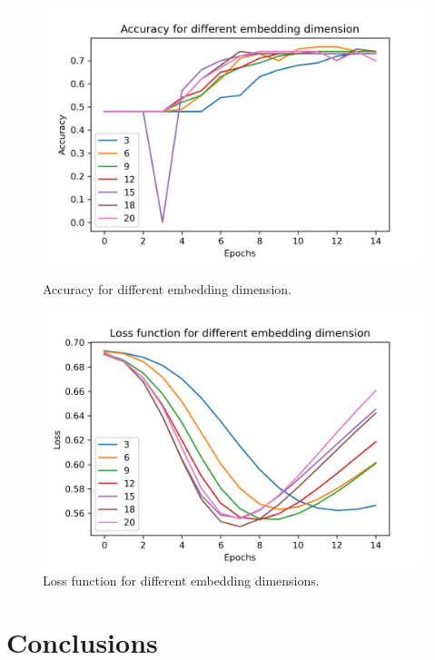 \documentclass{article}
\begin{document}
\begin{figure}[h!]
  \centering
  \begin{minipage}[b]{0.45\textwidth}
    \includegraphics[width=\textwidth]{images/emd_dim_test_acc.png}
    \caption{Accuracy for different embedding dimension.}
  \end{minipage}
  \hfill
  \begin{minipage}[b]{0.45\textwidth}
    \includegraphics[width=\textwidth]{images/emd_dim_test_loss.png}
    \caption{Loss function for different embedding dimensions.}
  \end{minipage}
  \label{fig:embed}
\end{figure}

\section{Conclusions}
\end{document}
